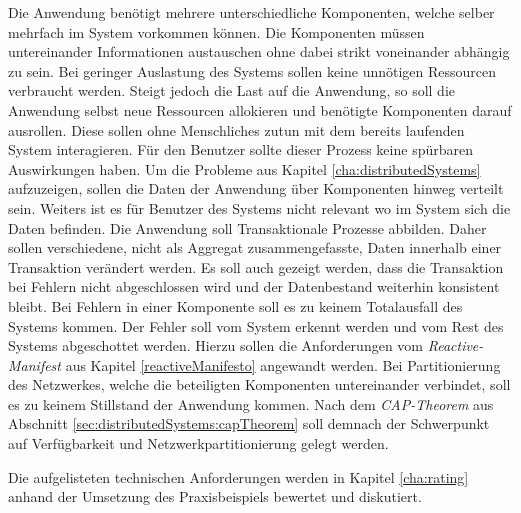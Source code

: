 \begin{enumerate}
    Die Anwendung benötigt mehrere unterschiedliche Komponenten, welche selber mehrfach im System vorkommen können. Die Komponenten müssen untereinander Informationen austauschen ohne dabei strikt voneinander abhängig zu sein.
    Bei geringer Auslastung des Systems sollen keine unnötigen Ressourcen verbraucht werden. Steigt jedoch die Last auf die Anwendung, so soll die Anwendung selbst neue Ressourcen allokieren und benötigte Komponenten darauf ausrollen. Diese sollen ohne Menschliches zutun mit dem bereits laufenden System interagieren. Für den Benutzer sollte dieser Prozess keine spürbaren Auswirkungen haben.
    Um die Probleme aus Kapitel \ref{cha:distributedSystems} aufzuzeigen, sollen die Daten der Anwendung über Komponenten hinweg verteilt sein. Weiters ist es für Benutzer des Systems nicht relevant wo im System sich die Daten befinden. 
    Die Anwendung soll Transaktionale Prozesse abbilden. Daher sollen verschiedene, nicht als Aggregat zusammengefasste, Daten innerhalb einer Transaktion verändert werden. Es soll auch gezeigt werden, dass die Transaktion bei Fehlern nicht abgeschlossen wird und der Datenbestand weiterhin konsistent bleibt.
    Bei Fehlern in einer Komponente soll es zu keinem Totalausfall des Systems kommen. Der Fehler soll vom System erkennt werden und vom Rest des Systems abgeschottet werden. Hierzu sollen die Anforderungen vom \textit{Reactive-Manifest} aus Kapitel \ref{reactiveManifesto} angewandt werden.
    Bei Partitionierung des Netzwerkes, welche die beteiligten Komponenten untereinander verbindet, soll es zu keinem Stillstand der Anwendung kommen. Nach dem \textit{CAP-Theorem} aus Abschnitt \ref{sec:distributedSystems:capTheorem} soll demnach der Schwerpunkt auf Verfügbarkeit und Netzwerkpartitionierung gelegt werden. 
\end{enumerate}
Die aufgelisteten technischen Anforderungen werden in Kapitel \ref{cha:rating} anhand der Umsetzung des Praxisbeispiels bewertet und diskutiert. 

